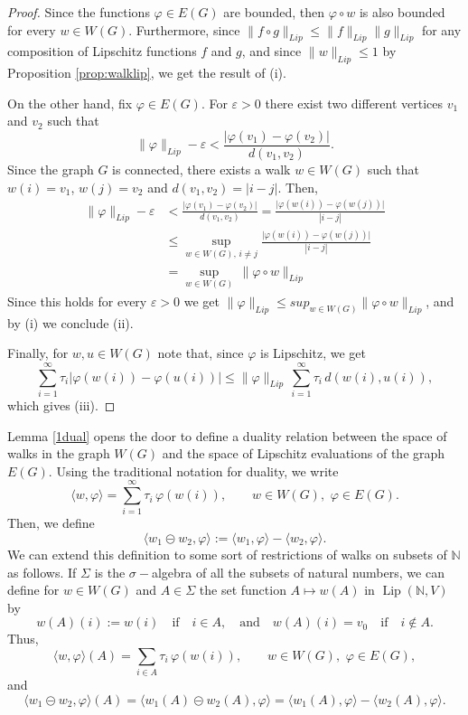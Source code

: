 \documentclass[preprint,12pt]{elsarticle}
\begin{document}
\begin{proof}
Since the functions $\varphi\in E(G)$ are bounded, then $\varphi\circ w$ is also bounded for every $w\in W(G)$. Furthermore, since $\|f\circ g\|_{Lip}\leq \|f\|_{Lip}\|g\|_{Lip}$ for any composition of Lipschitz functions $f$ and $g$, and since $\|w\|_{Lip}\leq 1$ by Proposition \ref{prop:walklip}, we get the result of (i).

On the other hand, fix $\varphi \in E(G).$ For $\varepsilon >0$ there exist two different vertices $v_1$ and $v_2$ such that 
$$
\|\varphi\|_{Lip} -\varepsilon <  \frac{\big| \varphi(v_1)- \varphi(v_2) \big|}{d(v_1,v_2)}.
$$
Since the graph $G$ is connected, there exists a walk $w\in W(G)$ such that $w(i)=v_1$, $w(j)=v_2$ and $d(v_1,v_2)=|i-j|$.
Then,
\begin{align*}
    \|\varphi\|_{Lip} -\varepsilon &<
  \frac{\big| \varphi(v_1)- \varphi(v_2) \big|}{d(v_1,v_2)}
  =
  \frac{\big| \varphi(w(i))- \varphi(w(j)) \big|}{|i-j|}\\
  &\le \sup_{w \in W(G), \, i \ne j}  \frac{\big| \varphi(w(i))- \varphi(w(j)) \big|}{|i-j|} \\ &= \sup_{w \in W(G)} \, \|\varphi \circ w\|_{Lip}
\end{align*}
Since this holds for every $\varepsilon>0$ we get $\|\varphi\|_{Lip}\leq sup_{w\in W(G)} \|\varphi\circ w\|_{Lip}$, and by (i) we conclude (ii).

Finally, for $w, u\in W(G)$ note that, since $\varphi$ is Lipschitz, we get
$$
\sum_{i=1}^\infty \tau_i \big|\varphi(w(i))- \varphi(u(i)) \big|
\le \|\varphi\|_{Lip} \, \sum_{i=1}^\infty \tau_i \, d(w(i),u(i)),
$$
which gives (iii).
    
\end{proof}

Lemma \ref{1dual} opens the door to define a duality relation between the space of walks in the graph $W(G)$ and the space of Lipschitz evaluations of the graph $E(G)$. Using the traditional notation for duality, we write
$$
\langle w, \varphi \rangle = \sum_{i=1}^\infty \tau_i \, \varphi(w(i)),
\qquad w \in W(G), \,\, \varphi \in E(G).
$$
Then, we define 
$$
\langle w_1 \circleddash w_2, \varphi \rangle := \langle w_1, \varphi \rangle - \langle w_2, \varphi \rangle.
$$
We can extend this definition to some sort of restrictions of walks on subsets of $\mathbb N$ as follows. If $\Sigma$ is the $\sigma-$algebra of all the subsets of natural numbers, we can define for $w \in W(G)$ and $A \in\Sigma$ the set function $A \mapsto w(A)$ in $\operatorname{Lip}(\mathbb N, V)$ by
$$
w(A)(i) := w(i) \quad \text{if} \quad i \in A, \quad \text{and} \quad
w(A)(i)= v_0 \quad \text{if} \quad i \notin A.
$$
Thus,
$$
\langle w, \varphi \rangle (A) = \sum_{i \in A} \tau_i \, \varphi(w(i)),
\qquad w \in W(G), \,\, \varphi \in E(G),
$$
and
$$
\langle w_1 \circleddash w_2, \varphi \rangle(A) = 
\langle w_1(A) \circleddash w_2(A), \varphi \rangle
=\langle w_1(A), \varphi \rangle - \langle w_2(A), \varphi \rangle.
$$
\end{document}
